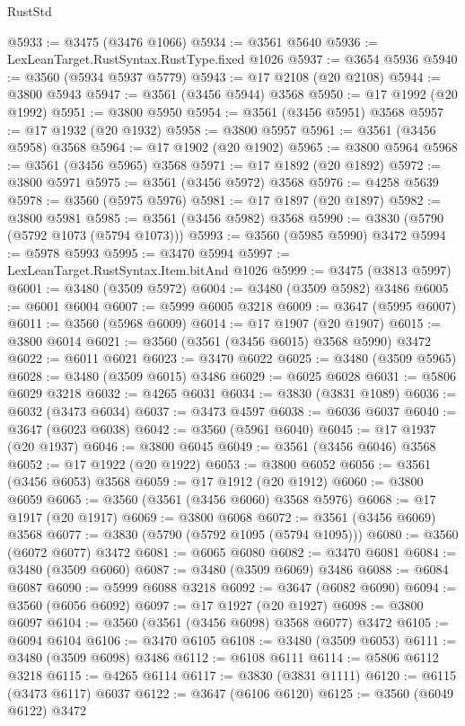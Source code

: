 \begin{lexlean}{RustStd}
\begin{coremodule}
{\begin{coremodule}
{{{{{{{{{{{{{{{{{{{{{{{{{{{{{{{{{{{{{{{{{{{{{@5933 := @3475 (@3476 @1066)
@5934 := @3561 @5640
@5936 := LexLeanTarget.RustSyntax.RustType.fixed @1026
@5937 := @3654 @5936
@5940 := @3560 (@5934 @5937 @5779)
@5943 := @17 @2108 (@20 @2108)
@5944 := @3800 @5943
@5947 := @3561 (@3456 @5944) @3568
@5950 := @17 @1992 (@20 @1992)
@5951 := @3800 @5950
@5954 := @3561 (@3456 @5951) @3568
@5957 := @17 @1932 (@20 @1932)
@5958 := @3800 @5957
@5961 := @3561 (@3456 @5958) @3568
@5964 := @17 @1902 (@20 @1902)
@5965 := @3800 @5964
@5968 := @3561 (@3456 @5965) @3568
@5971 := @17 @1892 (@20 @1892)
@5972 := @3800 @5971
@5975 := @3561 (@3456 @5972) @3568
@5976 := @4258 @5639
@5978 := @3560 (@5975 @5976)
@5981 := @17 @1897 (@20 @1897)
@5982 := @3800 @5981
@5985 := @3561 (@3456 @5982) @3568
@5990 := @3830 (@5790 (@5792 @1073 (@5794 @1073)))
@5993 := @3560 (@5985 @5990) @3472
@5994 := @5978 @5993
@5995 := @3470 @5994
@5997 := LexLeanTarget.RustSyntax.Item.bitAnd @1026
@5999 := @3475 (@3813 @5997)
@6001 := @3480 (@3509 @5972)
@6004 := @3480 (@3509 @5982) @3486
@6005 := @6001 @6004
@6007 := @5999 @6005 @3218
@6009 := @3647 (@5995 @6007)
@6011 := @3560 (@5968 @6009)
@6014 := @17 @1907 (@20 @1907)
@6015 := @3800 @6014
@6021 := @3560 (@3561 (@3456 @6015) @3568 @5990) @3472
@6022 := @6011 @6021
@6023 := @3470 @6022
@6025 := @3480 (@3509 @5965)
@6028 := @3480 (@3509 @6015) @3486
@6029 := @6025 @6028
@6031 := @5806 @6029 @3218
@6032 := @4265 @6031
@6034 := @3830 (@3831 @1089)
@6036 := @6032 (@3473 @6034)
@6037 := @3473 @4597
@6038 := @6036 @6037
@6040 := @3647 (@6023 @6038)
@6042 := @3560 (@5961 @6040)
@6045 := @17 @1937 (@20 @1937)
@6046 := @3800 @6045
@6049 := @3561 (@3456 @6046) @3568
@6052 := @17 @1922 (@20 @1922)
@6053 := @3800 @6052
@6056 := @3561 (@3456 @6053) @3568
@6059 := @17 @1912 (@20 @1912)
@6060 := @3800 @6059
@6065 := @3560 (@3561 (@3456 @6060) @3568 @5976)
@6068 := @17 @1917 (@20 @1917)
@6069 := @3800 @6068
@6072 := @3561 (@3456 @6069) @3568
@6077 := @3830 (@5790 (@5792 @1095 (@5794 @1095)))
@6080 := @3560 (@6072 @6077) @3472
@6081 := @6065 @6080
@6082 := @3470 @6081
@6084 := @3480 (@3509 @6060)
@6087 := @3480 (@3509 @6069) @3486
@6088 := @6084 @6087
@6090 := @5999 @6088 @3218
@6092 := @3647 (@6082 @6090)
@6094 := @3560 (@6056 @6092)
@6097 := @17 @1927 (@20 @1927)
@6098 := @3800 @6097
@6104 := @3560 (@3561 (@3456 @6098) @3568 @6077) @3472
@6105 := @6094 @6104
@6106 := @3470 @6105
@6108 := @3480 (@3509 @6053)
@6111 := @3480 (@3509 @6098) @3486
@6112 := @6108 @6111
@6114 := @5806 @6112 @3218
@6115 := @4265 @6114
@6117 := @3830 (@3831 @1111)
@6120 := @6115 (@3473 @6117) @6037
@6122 := @3647 (@6106 @6120)
@6125 := @3560 (@6049 @6122) @3472
}}}}}}}}}}}}}}}}}}}}}}}}}}}}}}}}}}}}}}}}}}}}}
\end{coremodule}}
\end{coremodule}
\end{lexlean}
